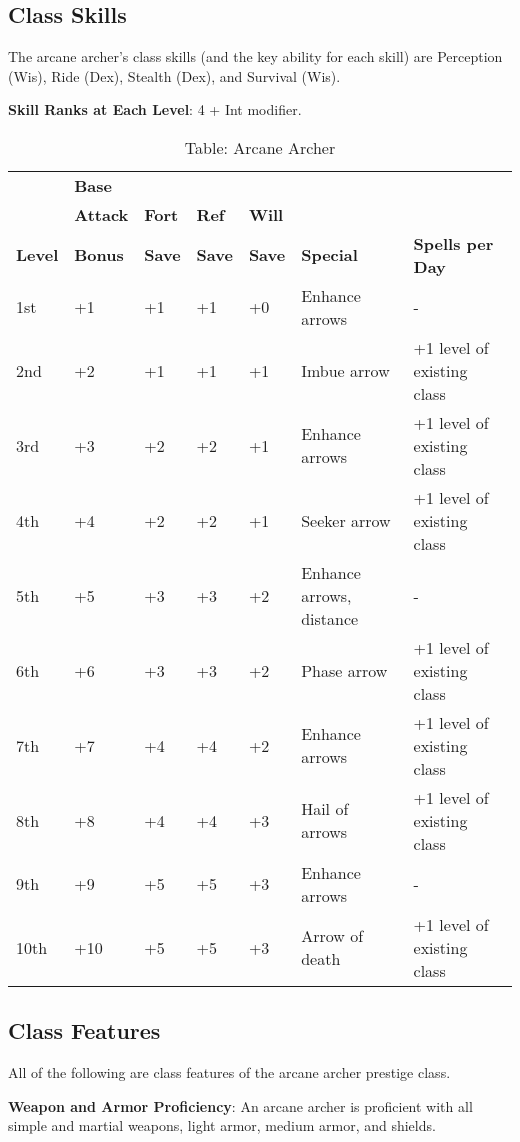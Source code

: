 \subsection{Class Skills}

				
The arcane archer's class skills (and the key ability for each skill) are Perception (Wis), Ride (Dex), Stealth (Dex), and Survival (Wis).
				
\textbf{Skill Ranks at Each Level}: 4 + Int modifier.

\begin{table*}[]
\sffamily
\caption{Table: Arcane Archer}
\begin{tabular}{lllllll}
      & \textbf{Base} & & & & & \\ 
      & \textbf{Attack} & \textbf{Fort} & \textbf{Ref} & \textbf{Will} & & \\
\textbf{Level} & \textbf{Bonus }& \textbf{Save }&\textbf{ Save }& \textbf{Save }& \textbf{Special }& \textbf{Spells per Day}\\
1st & +1 & +1 & +1 & +0 & Enhance arrows & -\\
2nd & +2 & +1 & +1 & +1 & Imbue arrow & +1 level of existing class\\
3rd & +3 & +2 & +2 & +1 & Enhance arrows & +1 level of existing class\\
4th & +4 & +2 & +2 & +1 & Seeker arrow & +1 level of existing class\\
5th & +5 & +3 & +3 & +2 & Enhance arrows, distance & -\\
6th & +6 & +3 & +3 & +2 & Phase arrow & +1 level of existing class\\
7th & +7 & +4 & +4 & +2 & Enhance arrows & +1 level of existing class\\
8th & +8 & +4 & +4 & +3 & Hail of arrows & +1 level of existing class\\
9th & +9 & +5 & +5 & +3 & Enhance arrows & -\\
10th & +10 & +5 & +5 & +3 & Arrow of death & +1 level of existing class\\
\end{tabular}
\end{table*}
				
\subsection{Class Features}

				
All of the following are class features of the arcane archer prestige class.
				
\textbf{Weapon and Armor Proficiency}: An arcane archer is proficient with all simple and martial weapons, light armor, medium armor, and shields.
				
